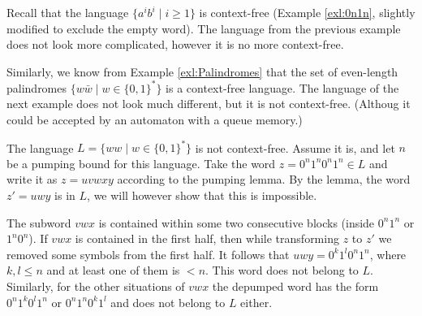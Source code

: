 \begin{page}
\setcounter{section}{7}
\setcounter{subsection}{2}
\setcounter{dfn}{4}
\label{portion:1160}


Recall that the language $\{a^ib^i \mid i \ge 1\}$ is context-free (Example \ref{exl:0n1n}, slightly modified to exclude the empty word).
The language from the previous example does not look more complicated, however it is no more context-free.

Similarly, we know from Example \ref{exl:Palindromes} that the set of even-length palindromes $\{w \bar{w} \mid w \in \{0,1\}^*\}$
is a context-free language.
The language of the next example does not look much different, but it is not context-free.
(Althoug it could be accepted by an automaton with a queue memory.)


\end{page}

\begin{page}
\setcounter{section}{7}
\setcounter{subsection}{2}
\setcounter{dfn}{5}
\label{portion:1162}

\begin{exl}
\label{exl:WW}
The language $L = \{ww \mid w \in \{0,1\}^*\}$ is not context-free.
Assume it is, and let $n$ be a pumping bound for this language.
Take the word $z = 0^n1^n0^n1^n \in L$ and write it as $z = uvwxy$ according to the pumping lemma.
By the lemma, the word $z' = uwy$ is in $L$, we will however show that this is impossible.

The subword $vwx$ is contained within some two consecutive blocks (inside $0^n1^n$ or $1^n0^n$).
If $vwx$ is contained in the first half, then while transforming $z$ to $z'$ we removed some symbols from the first half.
It follows that $uwy = 0^k1^l0^n1^n$, where $k, l \le n$ and at least one of them is $<n$.
This word does not belong to $L$.
Similarly, for the other situations of $vwx$ the depumped word has the form $0^n1^k0^l1^n$ or $0^n1^n0^k1^l$ and does not belong to $L$ either.
\end{exl}

\end{page}

